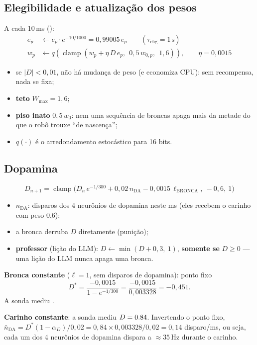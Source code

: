 \documentclass[11pt,a4paper]{article}
\DeclareRobustCommand{\cod}[1]{\texttt{\detokenize{#1}}}
\newcommand{\Hz}{\,\mathrm{Hz}}
\begin{document}
\subsection{Elegibilidade e atualização dos pesos}

A cada 10\,ms (\cod{aprender()}):
\begin{align}
e_p &\leftarrow e_p \cdot e^{-10/1000} = 0{,}99005\,e_p \qquad (\tau_\text{elig} = 1\,\mathrm{s}) \\
w_p &\leftarrow q\!\left(\operatorname{clamp}\left(w_p + \eta\,D\,e_p,\ \ 0{,}5\,w_{0,p},\ \ 1{,}6\right)\right), \qquad \eta = 0{,}0015
\end{align}
\begin{itemize}
  \item se $|D| < 0{,}01$, não há mudança de peso (e economiza CPU): sem recompensa, nada se fixa;
  \item \textbf{teto} $W_\text{max} = 1{,}6$;
  \item \textbf{piso inato} $0{,}5\,w_0$: nem uma sequência de broncas apaga mais da metade do que o robô trouxe “de nascença”;
  \item $q(\cdot)$ é o arredondamento estocástico para 16 bits.
\end{itemize}

\subsection{Dopamina}

\begin{equation}
D_{n+1} = \operatorname{clamp}\Big(D_n\,e^{-1/300} + 0{,}02\,n_\text{DA} - 0{,}0015\,\ell_\text{BRONCA},\ -0{,}6,\ 1\Big)
\end{equation}
\begin{itemize}
  \item $n_\text{DA}$: disparos dos 4 neurônios de dopamina neste ms (eles recebem o carinho com peso 0,6);
  \item a bronca derruba $D$ diretamente (punição);
  \item \textbf{professor} (lição do LLM): $D \leftarrow \min(D + 0{,}3,\ 1)$, \textbf{somente se} $D \ge 0$ — uma lição do LLM nunca apaga uma bronca.
\end{itemize}

\begin{exemplo}
\textbf{Bronca constante} ($\ell=1$, sem disparos de dopamina): ponto fixo
\[ D^\ast = \frac{-0{,}0015}{1 - e^{-1/300}} = \frac{-0{,}0015}{0{,}003328} = -0{,}451 . \]
A sonda mediu \textbf{\vDaBronca}.

\textbf{Carinho constante}: a sonda mediu $D = 0.84$. Invertendo o ponto fixo,
$\bar n_\text{DA} = D^\ast(1-\alpha_D)/0{,}02 = 0{,}84 \times 0{,}003328/0{,}02 = 0{,}14$ disparo/ms, ou seja, cada um dos 4
neurônios de dopamina dispara a $\approx 35\Hz$ durante o carinho.
\end{exemplo}
\end{document}
